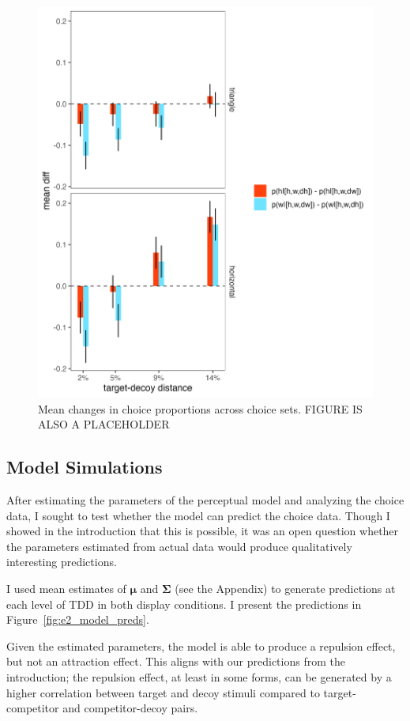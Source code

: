 \begin{figure}
   \includegraphics[width=\textwidth]{figures/choicePhase_delta_means.jpeg}
   \caption{Mean changes in choice proportions across choice sets. FIGURE IS ALSO A PLACEHOLDER}
   \label{e2_choicedeltas}
\end{figure}

\subsection{Model Simulations}
After estimating the parameters of the perceptual model and analyzing the choice data, I sought to test whether the model can predict the choice data. Though I showed in the introduction that this is possible, it was an open question whether the parameters estimated from actual data would produce qualitatively interesting predictions.

I used mean estimates of $\boldsymbol{\mu}$ and $\boldsymbol{\Sigma}$ (see the Appendix) to generate predictions at each level of TDD in both display conditions. I present the predictions in Figure~\ref{fig:e2_model_preds}. 

Given the estimated parameters, the model is able to produce a repulsion effect, but not an attraction effect. This aligns with our predictions from the introduction; the repulsion effect, at least in some forms, can be generated by a higher correlation between target and decoy stimuli compared to target-competitor and competitor-decoy pairs.

